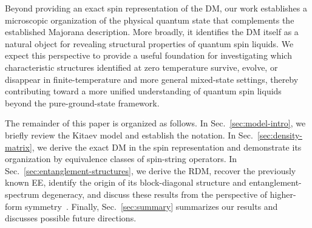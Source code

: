 {Beyond providing an exact spin representation of the DM, our work establishes a microscopic organization of the physical quantum state that complements the established Majorana description. More broadly, it identifies the DM itself as a natural object for revealing structural properties of quantum spin liquids. We expect this perspective to provide a useful foundation for investigating which characteristic structures identified at zero temperature survive, evolve, or disappear in finite-temperature and more general mixed-state settings, thereby contributing toward a more unified understanding of quantum spin liquids beyond the pure-ground-state framework.

The remainder of this paper is organized as follows. In Sec.~\ref{sec:model-intro}, we briefly review the Kitaev model and establish the notation. In Sec.~\ref{sec:density-matrix}, we derive the exact DM in the spin representation and demonstrate its organization by equivalence classes of spin-string operators. In Sec.~\ref{sec:entanglement-structures}, we derive the RDM, recover the previously known EE, identify the origin of its block-diagonal structure and entanglement-spectrum degeneracy, and discuss these results from the perspective of higher-form symmetry~\cite{Xu-Rakovszky-Knap-Pollmann_2025}. Finally, Sec.~\ref{sec:summary} summarizes our results and discusses possible future directions.
}